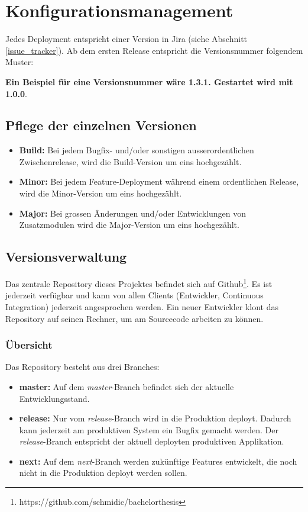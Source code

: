 \section{Konfigurationsmanagement}
Jedes Deployment entspricht einer Version in Jira (siehe Abschnitt \ref{issue_tracker}).
Ab dem ersten Release entspricht die Versionsnummer folgendem Muster:
\begin{center}
\end{center}

\textbf{Ein Beispiel für eine Versionsnummer wäre 1.3.1. Gestartet wird mit 1.0.0}. 
\subsection{Pflege der einzelnen Versionen}
\begin{itemize}
\item \textbf{Build:} Bei jedem Bugfix- und/oder sonstigen ausserordentlichen Zwischenrelease, wird die Build-Version um eins hochgezählt.
\item \textbf{Minor:} Bei jedem Feature-Deployment während einem ordentlichen Release, wird die Minor-Version um eins hochgezählt.
\item \textbf{Major:} Bei grossen Änderungen und/oder Entwicklungen von Zusatzmodulen wird die Major-Version um eins hochgezählt.

\end{itemize}


\subsection{Versionsverwaltung}
Das zentrale Repository dieses Projektes befindet sich auf Github\footnote{https://github.com/schmidic/bachelorthesis}. Es ist jederzeit verfügbar und kann von allen Clients (Entwickler, Continuous Integration) jederzeit angesprochen werden. Ein neuer Entwickler klont das Repository auf seinen Rechner, um am Sourcecode arbeiten zu können.
\subsubsection{Übersicht}
Das Repository besteht aus drei Branches:
\begin{itemize}
\item \textbf{master:} Auf dem \textit{master}-Branch befindet sich der aktuelle Entwicklungsstand. 
\item \textbf{release:} Nur vom \textit{release}-Branch wird in die Produktion deployt. Dadurch kann jederzeit am produktiven System ein Bugfix gemacht werden. Der \textit{release}-Branch entspricht der aktuell deployten produktiven Applikation.
\item \textbf{next:} Auf dem \textit{next}-Branch werden zukünftige Features entwickelt, die noch nicht in die Produktion deployt werden sollen.
\end{itemize}

